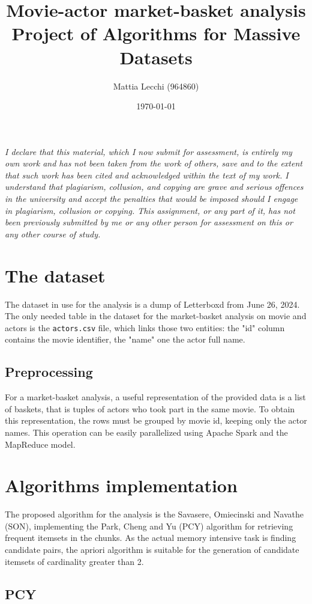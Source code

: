 \documentclass{article}
\author{Mattia Lecchi (964860)}
\date{\today}
\title{Movie-actor market-basket analysis\\ 
	\large Project of Algorithms for Massive Datasets}
\begin{document}
\maketitle
\textit{I declare that this material, which
	I now submit for assessment, is entirely my own work and has not been taken from the
	work of others, save and to the extent that such work has been cited and acknowledged within the
	text of my work. I understand that plagiarism, collusion, and copying are grave and
	serious offences in the university and accept the penalties that would be imposed should I engage
	in plagiarism, collusion or copying. This assignment, or any part of it, has not been previously
	submitted by me or any other person for assessment on this or any other course of study.}

\section{The dataset}
\label{sec:dataset}
The dataset in use for the analysis is a dump of Letterboxd from June 26, 2024.
The only needed table in the dataset for the market-basket analysis on movie and actors is the \texttt{actors.csv} file, which links those two entities: the "id" column contains the movie identifier, the "name" one the actor full name. 

\subsection{Preprocessing}
For a market-basket analysis, a useful representation of the provided data is a list of baskets, that is tuples of actors who took part in the same movie. To obtain this representation, the rows must be grouped by movie id, keeping only the actor names. This operation can be easily parallelized using Apache Spark and the MapReduce model. 

\section{Algorithms implementation}

The proposed algorithm for the analysis is the Savasere, Omiecinski and Navathe (SON), implementing the Park, Cheng and Yu (PCY) algorithm for retrieving frequent itemsets in the chunks. As the actual memory intensive task is finding candidate pairs, the apriori algorithm is suitable for the generation of candidate itemsets of cardinality greater than 2.

\subsection{PCY}
\end{document}

